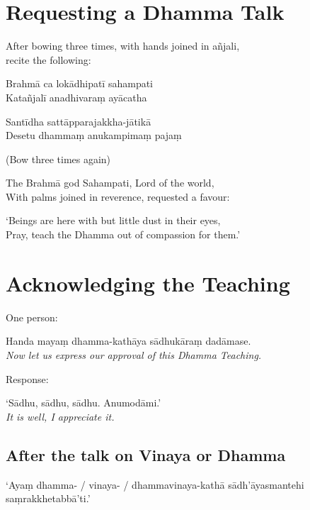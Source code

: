\section{Requesting a Dhamma Talk}

\begin{instruction}
  After bowing three times, with hands joined in añjali,\\
  recite the following:
\end{instruction}

Brahmā ca lokādhipatī sahampati\\
Katañjalī anadhivaraṃ ayācatha

Santīdha sattāpparajakkha-jātikā\\
Desetu dhammaṃ anukampimaṃ pajaṃ

\ifhandbookedition
\enlargethispage{\baselineskip}
\fi

\begin{instruction}
  (Bow three times again)
\end{instruction}

\begin{english}
The Brahmā god Sahampati, Lord of the world,\\
With palms joined in reverence, requested a favour:

`Beings are here with but little dust in their eyes,\\
Pray, teach the Dhamma out of compassion for them.'
\end{english}


\section{Acknowledging the Teaching}

One person:

Handa mayaṃ dhamma-kathāya sādhukāraṃ dadāmase.\\
\emph{Now let us express our approval of this Dhamma Teaching.}

Response:

‘Sādhu, sādhu, sādhu. Anumodāmi.’\\
\emph{It is well, I appreciate it.}

\subsection{After the talk on Vinaya or Dhamma}

‘Ayaṃ dhamma- / vinaya- / dhammavinaya-kathā sādh'āyasmantehi saṃrakkhetabbā'ti.’

